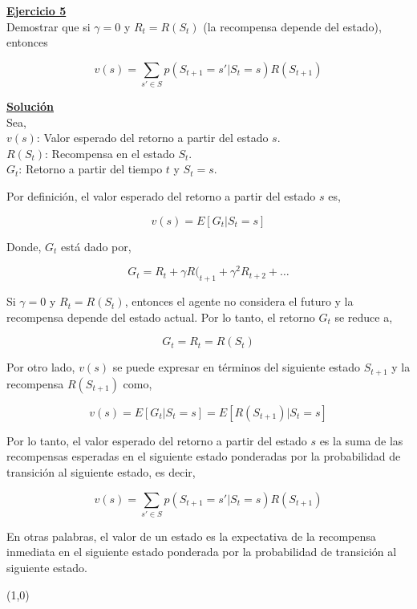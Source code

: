 \indent\underline{\textbf{Ejercicio 5}}\\
Demostrar que si $\gamma = 0$ y $R_t = R(S_t)$ (la recompensa depende del estado), entonces

\[
    v(s) = \sum_{s' \in S} p(S_{t+1} = s' | S_t = s) R(S_{t+1})
\]

\indent\underline{\textbf{Solución}}\\
Sea,\\
$v(s)$: Valor esperado del retorno a partir del estado $s$.\\
$R(S_t)$: Recompensa en el estado $S_t$.\\
$G_t$: Retorno a partir del tiempo $t$ y $S_t = s$.

Por definición, el valor esperado del retorno a partir del estado $s$ es,

\[
    v(s) = E[G_t | S_t = s]
\]

Donde, $G_t$ está dado por,

\[
    G_t = R_t + \gamma R(_{t+1} + \gamma^2 R_{t+2} + \ldots
\]

Si $\gamma = 0$ y $R_t = R(S_t)$, entonces el agente no considera el futuro y la recompensa depende del estado actual.
Por lo tanto, el retorno $G_t$ se reduce a,

\[
    G_t = R_t = R(S_t)
\]

Por otro lado, $v(s)$ se puede expresar en términos del siguiente estado $S_{t+1}$ y la recompensa $R(S_{t+1})$ como,

\[
    v(s) = E[G_t | S_t = s] = E[R(S_{t+1}) | S_t = s]
\]

Por lo tanto, el valor esperado del retorno a partir del estado $s$ es la suma de las recompensas esperadas en el siguiente estado ponderadas por la probabilidad de transición al siguiente estado, es decir,

\[
    v(s) = \sum_{s' \in S} p(S_{t+1} = s' | S_t = s) R(S_{t+1})
\]

En otras palabras, el valor de un estado es la expectativa de la recompensa inmediata en el siguiente estado ponderada por la probabilidad de transición al siguiente estado.

\line(1,0){\textwidth}
